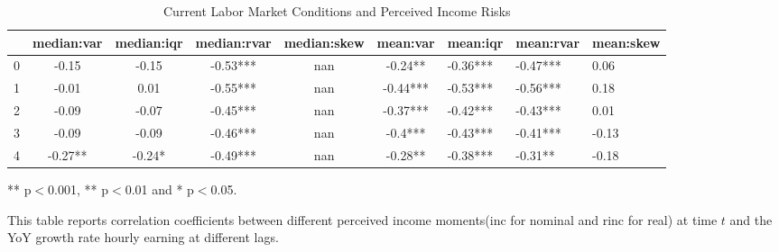 
\begin{table}[ht]
\centering
\begin{adjustbox}{width={\textwidth}}
\begin{threeparttable}
\caption{Current Labor Market Conditions and Perceived Income Risks}
\label{macro_corr_he}
\begin{tabular}{cccccclll}
\toprule
{} & median:var & median:iqr & median:rvar & median:skew &  mean:var &  mean:iqr & mean:rvar & mean:skew \\
\midrule
0 &      -0.15 &      -0.15 &    -0.53*** &         nan &   -0.24** &  -0.36*** &  -0.47*** &      0.06 \\
1 &      -0.01 &       0.01 &    -0.55*** &         nan &  -0.44*** &  -0.53*** &  -0.56*** &      0.18 \\
2 &      -0.09 &      -0.07 &    -0.45*** &         nan &  -0.37*** &  -0.42*** &  -0.43*** &      0.01 \\
3 &      -0.09 &      -0.09 &    -0.46*** &         nan &   -0.4*** &  -0.43*** &  -0.41*** &     -0.13 \\
4 &    -0.27** &     -0.24* &    -0.49*** &         nan &   -0.28** &  -0.38*** &   -0.31** &     -0.18 \\
\bottomrule
\end{tabular}
\begin{tablenotes}
\item *** p$<$0.001, ** p$<$0.01 and * p$<$0.05.
\item This table reports correlation coefficients between different perceived income moments(inc for nominal
and rinc for real) at time
$t$ and the YoY growth rate hourly earning at different lags.
\end{tablenotes}
\end{threeparttable}
\end{adjustbox}
\end{table}